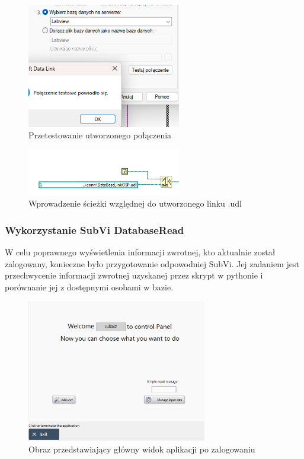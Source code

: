\documentclass{report}
\begin{document}
\begin{figure}[H]
    \centering
    \includegraphics[width=0.6\textwidth]{src/Database/Stage6.png}
    \caption{Przetestowanie utworzonego połączenia}
    \label{fig:first-att}
\end{figure}

\begin{figure}[H]
    \centering
    \includegraphics[width=0.6\textwidth]{src/Database/Stage7.png}
    \caption{Wprowadzenie ścieżki względnej do utworzonego linku .udl}
    \label{fig:first-att}
\end{figure}



\newpage
\subsubsection{\large Wykorzystanie SubVi DatabaseRead}

W celu poprawnego wyświetlenia informacji zwrotnej, kto aktualnie został zalogowany, konieczne było przygotowanie odpowodniej
SubVi. Jej zadaniem jest przechwycenie informacji zwrotnej uzyskanej przez skrypt w pythonie i porównanie jej z dostępnymi osobami w bazie. 

\begin{figure}[H]
    \centering
    \includegraphics[width=0.7\textwidth]{src/Logged.png}
    \caption{Obraz przedstawiający główny widok aplikacji po zalogowaniu}
    \label{fig:first-att}
\end{figure}
\end{document}
